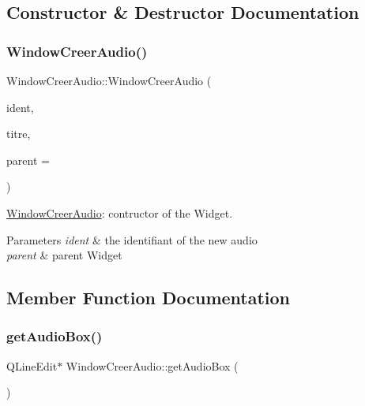 \subsection{Constructor \& Destructor Documentation}
\mbox{\label{class_window_creer_audio_a48d3b4969c255f0565409a6dcf80014d}} 
\subsubsection{\texorpdfstring{Window\+Creer\+Audio()}{WindowCreerAudio()}}
{\footnotesize\ttfamily Window\+Creer\+Audio\+::\+Window\+Creer\+Audio (\begin{DoxyParamCaption}\item[{Q\+String \&}]{ident,  }\item[{Q\+String \&}]{titre,  }\item[{Q\+Widget $\ast$}]{parent = {} }\end{DoxyParamCaption})}



\hyperlink{class_window_creer_audio}{Window\+Creer\+Audio}\+: contructor of the Widget. 


\begin{DoxyParams}{Parameters}
{\em ident} & the identifiant of the new audio \\
\hline
{\em parent} & parent Widget \\
\hline
\end{DoxyParams}


\subsection{Member Function Documentation}
\mbox{\label{class_window_creer_audio_a906b5837d7df59111a0db173e0f48b3b}} 
\subsubsection{\texorpdfstring{get\+Audio\+Box()}{getAudioBox()}}
{\footnotesize\ttfamily Q\+Line\+Edit$\ast$ Window\+Creer\+Audio\+::get\+Audio\+Box (\begin{DoxyParamCaption}{ }\end{DoxyParamCaption})\hspace{0.3cm}{\ttfamily [inline]}}



